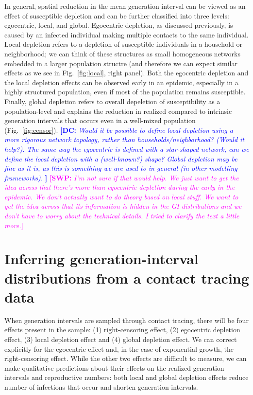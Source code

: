 \documentclass[12pt]{article}
\newcommand{\fref}[1]{Fig.~\ref{fig:#1}}
\newcommand{\comment}[3]{\textcolor{#1}{\textbf{[#2: }\textsl{#3}\textbf{]}}}
\newcommand{\swp}[1]{\comment{magenta}{SWP}{#1}}
\newcommand{\dc}[1]{\comment{blue}{DC}{#1}}
\begin{document}
In general, spatial reduction in the mean generation interval can be viewed as an effect of susceptible depletion and can be further classified into three levels: egocentric, local, and global.
Egocentric depletion, as discussed previously, is caused by an infected individual making multiple contacts to the same individual.
Local depletion refers to a depletion of susceptible individuals in a household or neighborhood;
we can think of these structures as small homogeneous networks embedded in a larger population structre (and therefore we can expect similar effects as we see in \fref{local}, right panel).
Both the egocentric depletion and the local depletion effects can be observed early in an epidemic, especially in a highly structured population, even if most of the population remains susceptible.
Finally, global depletion refers to overall depeletion of susceptibility as a population-level and explains the reduction in realized compared to intrinsic generation intervals that occurs even in a well-mixed population (\fref{censor}). 
\dc{Would it be possible to define local depletion using a more rigorous network topology, rather than households/neighborhood? (Would it help?). The same way the egocentric is defined with a star-shaped network, can we define the local depletion with a (well-known?) shape? Global depletion may be fine as it is, as this is something we are used to in general (in other modelling frameworks). }
\swp{I'm not sure if that would help. We just want to get the idea across that there's more than egocentric depletion during the early in the epidemic. We don't actually want to do theory based on local stuff. We want to get the idea across that its information is hidden in the GI distributions and we don't have to worry about the technical details. I tried to clarify the text a little more.}

\section{Inferring generation-interval distributions from a contact tracing data}

When generation intervals are sampled through contact tracing, there will be four effects present in the sample: (1) right-censoring effect, (2) egocentric depletion effect, (3) local depletion effect and (4) global depletion effect.
We can correct explicitly for the egocentric effect and, in the case of exponential growth, the right-censoring effect.
While the other two effects are difficult to measure, we can make qualitative predictions about their effects on the realized generation intervals and reproductive numbers: 
both local and global depletion effects reduce number of infections that occur and shorten generation intervals.
\end{document}
